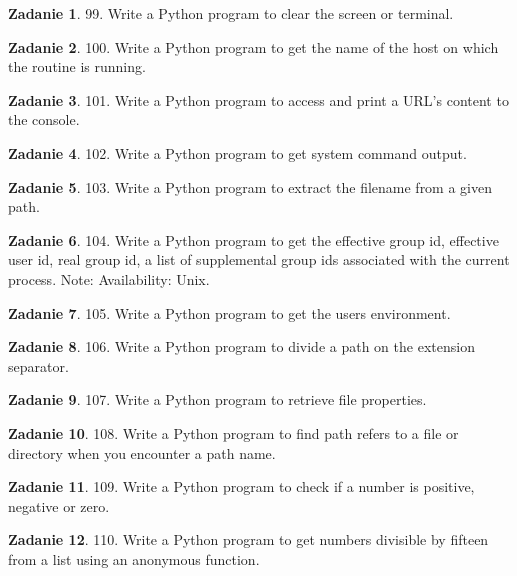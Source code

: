 \documentclass[11pt]{article}
\theoremstyle{definition}
\newtheorem{zadanie}{Zadanie}
\begin{document}
\begin{zadanie}
99. Write a Python program to clear the screen or terminal.
\end{zadanie}

\begin{zadanie}
100. Write a Python program to get the name of the host on which the routine is running.
\end{zadanie}

\begin{zadanie}
101. Write a Python program to access and print a URL's content to the console.
\end{zadanie}

\begin{zadanie}
102. Write a Python program to get system command output.
\end{zadanie}

\begin{zadanie}
103. Write a Python program to extract the filename from a given path.
\end{zadanie}

\begin{zadanie}
104. Write a Python program to get the effective group id, effective user id, real group id, a list of supplemental group ids associated with the current process.
Note: Availability: Unix.
\end{zadanie}

\begin{zadanie}
105. Write a Python program to get the users environment.
\end{zadanie}

\begin{zadanie}
106. Write a Python program to divide a path on the extension separator.
\end{zadanie}

\begin{zadanie}
107. Write a Python program to retrieve file properties.
\end{zadanie}

\begin{zadanie}
108. Write a Python program to find path refers to a file or directory when you encounter a path name.
\end{zadanie}

\begin{zadanie}
109. Write a Python program to check if a number is positive, negative or zero.
\end{zadanie}

\begin{zadanie}
110. Write a Python program to get numbers divisible by fifteen from a list using an anonymous function.
\end{zadanie}
\end{document}
